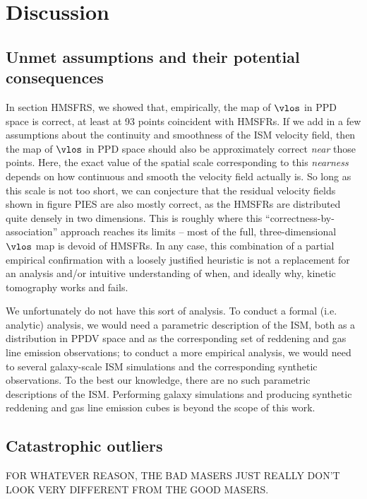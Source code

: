 \section{Discussion}
\label{sec:discussion}

\subsection{Unmet assumptions and their potential consequences}
\label{sec:discussion-systematics}
In section HMSFRS, we showed that, empirically, the map of $\vlos$ in PPD space is correct, at least at 93 points coincident with HMSFRs. 
If we add in a few assumptions about the continuity and smoothness of the ISM velocity field, then the map of $\vlos$ in PPD space should also be approximately correct \emph{near} those points. 
Here, the exact value of the spatial scale corresponding to this \emph{nearness} depends on how continuous and smooth the velocity field actually is.
So long as this scale is not too short, we can conjecture that the residual velocity fields shown in figure PIES are also mostly correct, as the HMSFRs are distributed quite densely in two dimensions. 
This is roughly where this ``correctness-by-association'' approach reaches its limits -- most of the full, three-dimensional $\vlos$ map is devoid of HMSFRs.
In any case, this combination of a partial empirical confirmation with a loosely justified heuristic is not a replacement for an analysis and/or intuitive understanding of when, and ideally why, kinetic tomography works and fails.

We unfortunately do not have this sort of analysis. 
To conduct a formal (i.e. analytic) analysis, we would need a parametric description of the ISM, both as a distribution in PPDV space and as the corresponding set of reddening and gas line emission observations; to conduct a more empirical analysis, we would need to several galaxy-scale ISM simulations and the corresponding synthetic observations. 
To the best our knowledge, there are no such parametric descriptions of the ISM.
Performing galaxy simulations and producing synthetic reddening and gas line emission cubes is beyond the scope of this work.




\subsection{Catastrophic outliers}
\label{sec:discussion-catastrophic}
FOR WHATEVER REASON, THE BAD MASERS JUST REALLY DON'T LOOK VERY DIFFERENT FROM THE GOOD MASERS. 


